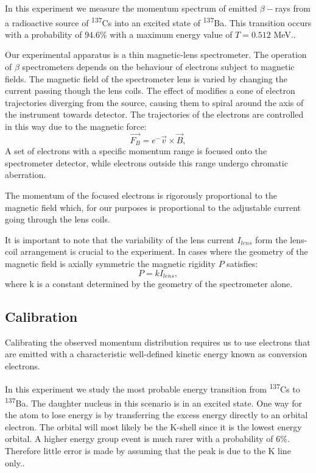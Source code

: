 \documentclass[12pt, a4paper]{article}
\begin{document}
\begin{multicols}{2}
In this experiment we measure the momentum spectrum of emitted $\beta-$rays from a radioactive source of \textsuperscript{137}Cs into an excited state of \textsuperscript{137}Ba. This transition occurs with a probability of $94.6\%$ with a maximum energy value of $T = 0.512$ MeV.\cite{SPA}.

Our experimental apparatus is a thin magnetic-lens spectrometer. 
The operation of $\beta$ spectrometers depends on the behaviour of electrons subject to magnetic fields. The magnetic field of the spectrometer lens is varied by changing the current passing though the lens coils.
The effect of modifies a cone of electron trajectories diverging from the source, causing them to spiral around the axis of the instrument towards detector\cite{SPA}. 
The trajectories of the electrons are controlled in this way due to the magnetic force: 
\begin{equation}\vec{F_{B}} = e^{-} \vec{v} \times \vec{B},
\end{equation} 
A set of electrons with a specific momentum range is focused onto the spectrometer detector, while electrons outside this range undergo chromatic aberration. 

The momentum of the focused electrons is rigorously proportional to the magnetic field which, for our purposes is proportional to the adjustable current going through the lens coils. 

It is important to note that the variability of the lens current $I_{lens}$ form the lens-coil arrangement is crucial to the experiment. In cases where the geometry of the magnetic field is axially symmetric\cite{QH} the magnetic rigidity $P$ satisfies:
\begin{equation}P = kI_{lens},
\end{equation}
where k is a constant determined by the geometry of the spectrometer alone\cite{QH}.
\subsection{Calibration}
Calibrating the observed momentum distribution requires us to use electrons that are emitted with a characteristic well-defined kinetic energy known as conversion electrons\cite{SPA}.

In this experiment we study the most probable energy transition from \textsuperscript{137}Cs to \textsuperscript{137}Ba.
The daughter nucleus in this scenario is in an excited state. One way for the atom to lose energy is by transferring the excess energy directly to an orbital electron\cite{SPA}.
The orbital will most likely be the K-shell since it is the lowest energy orbital. A higher energy group event is much rarer with a probability of $6\%$. Therefore little error is made  by assuming that the peak is due to the K line only.\cite{SPA}.


\end{multicols}
\end{document}
